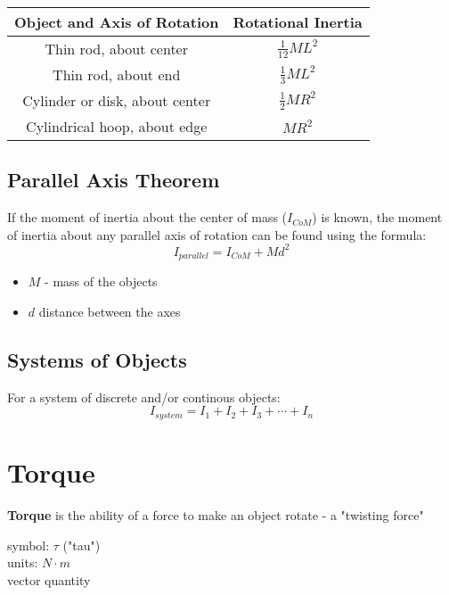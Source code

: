 \documentclass[titlepage]{article}
\begin{document}
\begin{table}[H]
    \centering
    \makegapedcells

    \begin{tabular}{c|c}
        \textbf{Object and Axis of Rotation} & \textbf{Rotational Inertia} \\
        \hline
        Thin rod, about center               & $\frac{1}{12}ML^2$          \\
        Thin rod, about end                  & $\frac{1}{3}ML^2$           \\
        Cylinder or disk, about center       & $\frac{1}{2} MR^2$        \\
        Cylindrical hoop, about edge       & $MR^2$
    \end{tabular}
\end{table}

\subsection{Parallel Axis Theorem}
If the moment of inertia about the center of mass ($I_{CoM}$) is known, the moment of inertia about any parallel axis of rotation can be found using the formula:
\begin{equation*}
    I_{parallel} = I_{CoM} + Md^2
\end{equation*}

\begin{itemize}
    \item $M$ - mass of the objects
    \item $d$ distance between the axes
\end{itemize}

\subsection{Systems of Objects}
For a system of discrete and/or continous objects:
\begin{equation*}
    I_{system} = I_1 + I_2 + I_3 + \cdots + I_n
\end{equation*}

\section{Torque}
\textbf{Torque} is the ability of a force to make an object rotate - a "twisting force"

symbol: $\tau$ ("tau") \\
units: $N \cdot m$ \\
vector quantity
\end{document}
